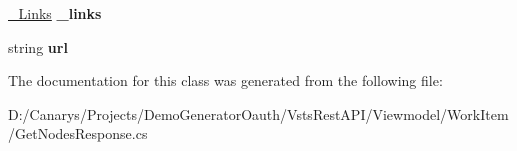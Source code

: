 \begin{DoxyCompactItemize}
\mbox{\hyperlink{class_vsts_rest_a_p_i_1_1_viewmodel_1_1_work_item_1_1_get_nodes_response_1_1___links}{\+\_\+\+Links}} {\bfseries \+\_\+links}
\item 
\mbox{\label{class_vsts_rest_a_p_i_1_1_viewmodel_1_1_work_item_1_1_get_nodes_response_1_1_nodes_a83d552cec045b67b247bbb744843d8d8}} 
string {\bfseries url}
\end{DoxyCompactItemize}


The documentation for this class was generated from the following file\+:\begin{DoxyCompactItemize}
\item 
D\+:/\+Canarys/\+Projects/\+Demo\+Generator\+Oauth/\+Vsts\+Rest\+A\+P\+I/\+Viewmodel/\+Work\+Item/Get\+Nodes\+Response.\+cs\end{DoxyCompactItemize}
